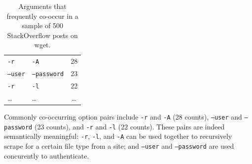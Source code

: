 \begin{table}
\caption{Arguments that frequently co-occur in a sample of 500 StackOverflow posts on wget.}
\label{tab:wget_arguments}
\centering
\begin{tabular}{llc}
\toprule
\headrow{Option 1} & \headrow{Option 2} & \headrow{Count} \\
\midrule
\texttt{-r} & \texttt{-A} & 28 \\ \midrule
\texttt{--user} & \texttt{--password} & 23 \\ \midrule
\texttt{-r} & \texttt{-l} & 22 \\ \midrule
\dots & \dots & \dots \\ \bottomrule
\end{tabular}
\end{table}
\fi

\begin{changes}
Commonly co-occurring option pairs include \texttt{-r} and \texttt{-A} (28 counts), \texttt{--user} and \texttt{--password} (23 counts), and \texttt{-r} and \texttt{-l} (22 counts).
These pairs are indeed semantically meaningful:
\texttt{-r}, \texttt{-l}, and \texttt{-A} can be used together to recursively scrape for a certain file type from a site;
and \texttt{--user} and \texttt{--password} are used concurently to authenticate.
\end{changes}

